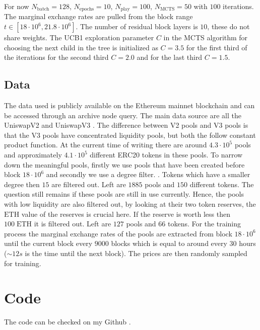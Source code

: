 For now $N_{\text{batch} }=128$, $N_{\text{epochs}} = 10$, $N_{\text{play}} =
100$, $N_{\text{MCTS}} = 50$ with $100$ iterations. The marginal exchange
rates are pulled from the block range $t \in [18\cdot10^{6}, 21.8\cdot10^6]$.
The number of residual block layers is $10$, these do not share weights. The
UCB1 exploration parameter $C$ in the MCTS algorithm for choosing the next
child in the tree is initialized as $C=3.5$ for the first third of the
iterations for the second third $C=2.0$ and for the last third $C=1.5$.
\subsection{Data}
The data used is publicly available on the Ethereum mainnet blockchain and
can be accessed through an archive node query. The main data source are all
the UniswapV2 and UniswapV3 \cite{uniswap}. The difference between V2 pools
and V3 pools is that the V3 pools have concentrated liquidity pools, but both
the follow constant product function. At the current time of writing there
are around $4.3\cdot10^{5}$ pools and approximately $4.1\cdot10^{5}$
different ERC20 \cite{erc20} tokens in these pools. To narrow down the
meaningful pools, firstly we use pools that have been created before block
$18\cdot10^{6}$ and secondly we use a degree filter. . Tokens which have a
smaller degree then $15$ are filtered out. Left are $1885$ pools and $150$
different tokens. The question still remains if these pools are still in use
currently. Hence, the pools with low liquidity are also filtered out, by
looking at their two token reserves, the $\text{ETH}$ value of the
reserves is crucial here. If the reserve is worth less then $100\; \text{ETH} $
it is filtered out. Left are $127$ pools and $66$ tokens. For the training
process the marginal exchange rates of the pools are extracted from block
$18\cdot10^{6}$ until the current block every $9000$ blocks which is equal
to around every $30$ hours ($\sim12s$ is the time until the next block). The
prices are then randomly sampled for training.

\section{Code}
The code can be checked on my Github \cite{github}.

\nocite{github}
\nocite{gatv2}
\nocite{gan_velickovic}
\printbibliography


